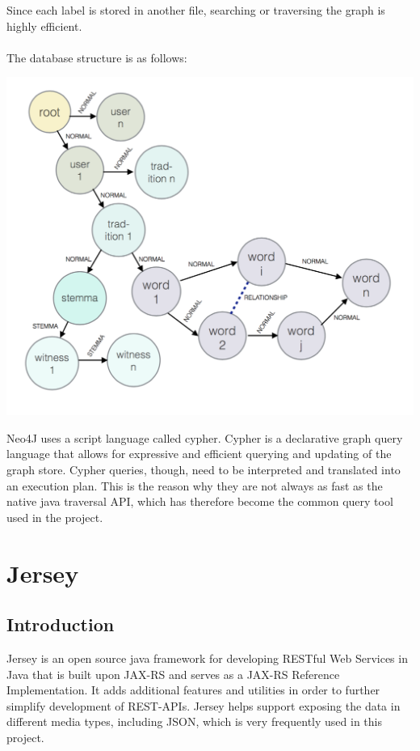 \documentclass[11pt,fleqn,openany]{book} %
\begin{document}
Since each label is stored in another file, searching or traversing the graph is highly efficient. \\ \quad \\ The database structure is as follows:
\begin{center}
\includegraphics[scale=.5]{Pictures/database.png} 
\end{center} 
Neo4J uses a script language called cypher. Cypher is a declarative graph query language that allows for expressive and efficient querying and updating of the graph store. Cypher queries, though, need to be interpreted and translated into an execution plan. This is the reason why they are not always as fast as the native java traversal API, which has therefore become the common query tool used in the project.




\chapter{Jersey}

\section*{Introduction}
Jersey is an open source java framework for developing RESTful Web Services in Java that is built upon JAX-RS and serves as a JAX-RS Reference Implementation. It adds additional features and utilities in order to further simplify development of REST-APIs. Jersey helps support exposing the data in different media types, including JSON, which is very frequently used in this project. 
\end{document}
